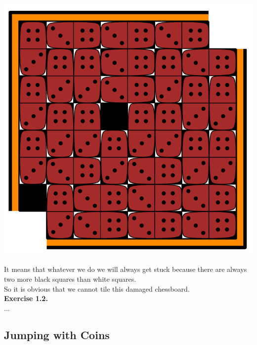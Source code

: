 \documentclass{article}
\begin{document}
\begin{flushleft}
\begin{center}
\includegraphics[scale=0.3]{1_1_2.png}
\end{center}
It means that whatever we do we will always get stuck because there are always two more black squares than white squares.\\
So it is obvious that we cannot tile this damaged chessboard.\\

\textbf{Exercise 1.2.} \\
...

\end{flushleft}
\subsection{Jumping with Coins}
\end{document}
